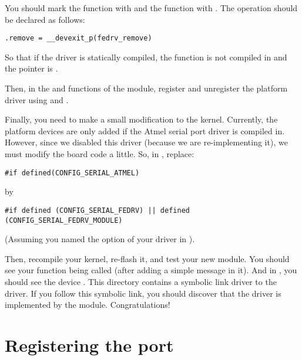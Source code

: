 You should mark the  function with  and
the 
function with . The  operation should be declared as
follows:

\begin{verbatim}
.remove = __devexit_p(fedrv_remove)
\end{verbatim}

So that if the driver is statically compiled, the
 function is not compiled in and the
 pointer is .

Then, in the  and  functions of the module, register and
unregister the platform driver using
 and
.

Finally, you need to make a small modification to the
kernel. Currently, the  platform devices are only added
if the Atmel serial port driver is compiled in. However, since we
disabled this driver (because we are re-implementing it), we must
modify the board code a little. So, in
, replace:

\begin{verbatim}
#if defined(CONFIG_SERIAL_ATMEL)
\end{verbatim}

by

\begin{verbatim}
#if defined (CONFIG_SERIAL_FEDRV) || defined (CONFIG_SERIAL_FEDRV_MODULE)
\end{verbatim}

(Assuming you named the option of your driver  in
).

Then, recompile your kernel, re-flash it, and test your new
module. You should see your  function being called
(after adding a simple  message in it). And in
, you should see the device
. This directory contains a symbolic link driver
to the  driver. If you follow this symbolic link,
you should discover that the  driver is implemented
by the  module. Congratulations!

\section{Registering the port}

